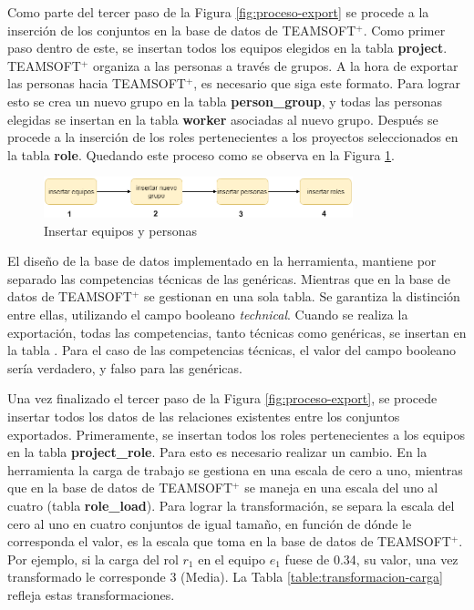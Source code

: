 Como parte del tercer paso de la Figura \ref{fig:proceso-export} se procede a la inserción de los conjuntos en la base de datos de TEAMSOFT$^+$. Como primer paso dentro de este, se insertan todos los equipos elegidos en la tabla \textbf{project}. TEAMSOFT$^+$ organiza a las personas a través de grupos. A la hora de exportar las personas hacia TEAMSOFT$^+$, es necesario que siga este formato. Para lograr esto se crea un nuevo grupo en la tabla \textbf{person\_group}, y todas las personas elegidas se insertan en la tabla \textbf{worker} asociadas al nuevo grupo. Después se procede a la inserción de los roles pertenecientes a los proyectos seleccionados en la tabla \textbf{role}. Quedando este proceso como se observa en la Figura \ref{fig:insert-equipo-y-personas}.

\begin{figure}[H]
	\centering
	\includegraphics[width=0.8\textwidth]{figuras/insertEquipoPersonas.png}
	\caption{Insertar equipos y personas}\label{fig:insert-equipo-y-personas}
\end{figure}

El diseño de la base de datos implementado en la herramienta, mantiene por separado las competencias técnicas de las genéricas. Mientras que en la base de datos de TEAMSOFT$^+$ se gestionan en una sola tabla. Se garantiza la distinción entre ellas, utilizando el campo booleano \textit{technical}. Cuando se realiza la exportación, todas las competencias, tanto técnicas como genéricas, se insertan en la tabla . Para el caso de las competencias técnicas, el valor del campo booleano sería verdadero, y falso para las genéricas.

Una vez finalizado el tercer paso de la Figura \ref{fig:proceso-export}, se procede insertar todos los datos de las relaciones existentes entre los conjuntos exportados. Primeramente, se insertan todos los roles pertenecientes a los equipos en la tabla \textbf{project\_role}. Para esto es necesario realizar un cambio. En la herramienta la carga de trabajo se gestiona en una escala de cero a uno, mientras que en la base de datos de TEAMSOFT$^+$ se maneja en una escala del uno al cuatro (tabla \textbf{role\_load}). Para lograr la transformación, se separa la escala del cero al uno en cuatro conjuntos de igual tamaño, en función de dónde le corresponda el valor, es la escala que toma en la base de datos de TEAMSOFT$^+$. Por ejemplo, si la carga del rol $r_1$ en el equipo $e_1$ fuese de 0.34, su valor, una vez transformado le corresponde 3 (Media). La Tabla \ref{table:transformacion-carga} refleja estas transformaciones.

